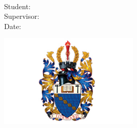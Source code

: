 %
%
%
\begin{titlepage}
  \begin{center}
    \vspace*{1cm}

    \Huge
    \textbf{\@title}\\
    \vspace{0.5cm}
    \LARGE
    \subtitle{}

    \Large
    \vspace{3cm}
    \degreeTitle{}

    \vspace{2cm}
    Student: \@author\\
    Supervisor: \supervisor{}\\
    Date: \@date \\

    \vfill

    \includegraphics[width=0.5\textwidth]{assets/aston.jpeg}

    \vspace{0.5cm}
    \institution{}\\
  \end{center}
\end{titlepage}
